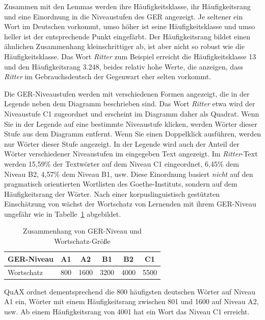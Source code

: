 \documentclass[11pt]{article}\usepackage[]{graphicx}\usepackage[]{color}
\begin{document}
Zusammen mit den Lemmas werden ihre Häufigkeitsklasse, ihr Häufigkeitsrang und eine Einordnung in die Niveaustufen des GER angezeigt. Je seltener ein Wort im Deutschen vorkommt, umso höher ist seine Häufigkeitsklasse und umso heller ist der entsprechende Punkt eingefärbt. Der Häufigkeitsrang bildet einen ähnlichen Zusammenhang kleinschrittiger ab, ist aber nicht so robust wie die Häufigkeitsklasse. Das Wort \textit{Ritter} zum Beispiel erreicht die Häufigkeitsklasse 13 und den Häufigkeitsrang 3.248, beides relativ hohe Werte, die anzeigen, dass \textit{Ritter} im Gebrauchsdeutsch der Gegenwart eher selten vorkommt. 

Die GER-Niveaustufen werden mit verschiedenen Formen angezeigt, die in der Legende neben dem Diagramm beschrieben sind. Das Wort \textit{Ritter} etwa wird der Niveaustufe C1 zugeordnet und erscheint im Diagramm daher als Quadrat. Wenn Sie in der Legende auf eine bestimmte Niveaustufe klicken, werden Wörter dieser Stufe aus dem Diagramm entfernt. Wenn Sie einen Doppelklick ausführen, werden nur Wörter dieser Stufe angezeigt. In der Legende wird auch der Anteil der Wörter verschiedener Niveaustufen im eingegeben Text angezeigt. Im \textit{Ritter}-Text werden 15,59\% der Textwörter auf dem Niveau C1 eingeordnet, 6,45\% dem Niveau B2, 4,57\% dem Niveau B1, usw. Diese Einordnung basiert \textit{nicht} auf den pragmatisch orientierten Wortlisten des Goethe-Instituts, sondern auf dem Häufigkeitsrang der Wörter. Nach einer korpuslinguistisch gestützten Einschätzung von \citet[101]{Tschirner.2019} wächst der Wortschatz von Lernenden mit ihrem GER-Niveau ungefähr wie in Tabelle~\ref{table:GER} abgebildet. 


\begin{table}[htbp]
\centering
\begin{threeparttable}
\caption{Zusammenhang von GER-Niveau und Wortschatz-Größe}
\label{table:GER}
\begin{tabular}{lccccc}
\toprule
GER-Niveau & A1 & A2 & B1 & B2 & C1 \\
\midrule
Wortschatz & 800 & 1600 & 3200 & 4000 & 5500 \\
\bottomrule
\end{tabular}
\end{threeparttable}
\end{table}

\noindent QuAX ordnet dementsprechend die 800 häufigsten deutschen Wörter auf Niveau A1 ein, Wörter mit einem Häufigkeitsrang zwischen 801 und 1600 auf Niveau A2, usw. Ab einem Häufigkeitsrang von 4001 hat ein Wort das Niveau C1 erreicht. 
\end{document}
